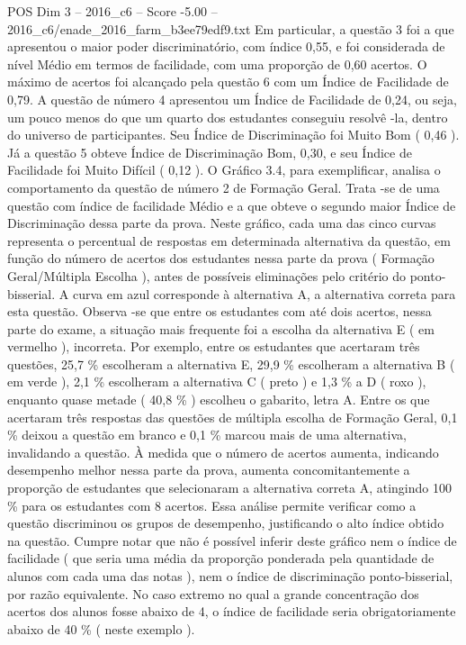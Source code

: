 \begin{textsample}{POS Dim 3 – 2016\_c6 – Score -5.00 – 2016\_c6/enade\_2016\_farm\_b3ee79edf9.txt}
Em particular, a questão 3 foi a que apresentou o maior poder discriminatório, com índice 0,55, e foi considerada de nível Médio em termos de facilidade, com uma proporção de 0,60 acertos.
O máximo de acertos foi alcançado pela questão 6 com um Índice de Facilidade de 0,79.
A questão de número 4 apresentou um Índice de Facilidade de 0,24, ou seja, um pouco menos do que um quarto dos estudantes conseguiu resolvê -la, dentro do universo de participantes.
Seu Índice de Discriminação foi Muito Bom ( 0,46 ).
Já a questão 5 obteve Índice de Discriminação Bom, 0,30, e seu Índice de Facilidade foi Muito Difícil ( 0,12 ).
O Gráfico 3.4, para exemplificar, analisa o comportamento da questão de número 2 de Formação Geral.
Trata -se de uma questão com índice de facilidade Médio e a que obteve o segundo maior Índice de Discriminação dessa parte da prova.
Neste gráfico, cada uma das cinco curvas representa o percentual de respostas em determinada alternativa da questão, em função do número de acertos dos estudantes nessa parte da prova ( Formação Geral/Múltipla Escolha ), antes de possíveis eliminações pelo critério do ponto-bisserial.
A curva em azul corresponde à alternativa A, a alternativa correta para esta questão.
Observa -se que entre os estudantes com até dois acertos, nessa parte do exame, a situação mais frequente foi a escolha da alternativa E ( em vermelho ), incorreta.
Por exemplo, entre os estudantes que acertaram três questões, 25,7 \% escolheram a alternativa E, 29,9 \% escolheram a alternativa B ( em verde ), 2,1 \% escolheram a alternativa C ( preto ) e 1,3 \% a D ( roxo ), enquanto quase metade ( 40,8 \% ) escolheu o gabarito, letra A.
Entre os que acertaram três respostas das questões de múltipla escolha de Formação Geral, 0,1 \% deixou a questão em branco e 0,1 \% marcou mais de uma alternativa, invalidando a questão.
À medida que o número de acertos aumenta, indicando desempenho melhor nessa parte da prova, aumenta concomitantemente a proporção de estudantes que selecionaram a alternativa correta A, atingindo 100 \% para os estudantes com 8 acertos.
Essa análise permite verificar como a questão discriminou os grupos de desempenho, justificando o alto índice obtido na questão.
Cumpre notar que não é possível inferir deste gráfico nem o índice de facilidade ( que seria uma média da proporção ponderada pela quantidade de alunos com cada uma das notas ), nem o índice de discriminação ponto-bisserial, por razão equivalente.
No caso extremo no qual a grande concentração dos acertos dos alunos fosse abaixo de 4, o índice de facilidade seria obrigatoriamente abaixo de 40 \% ( neste exemplo ).

\end{textsample}
